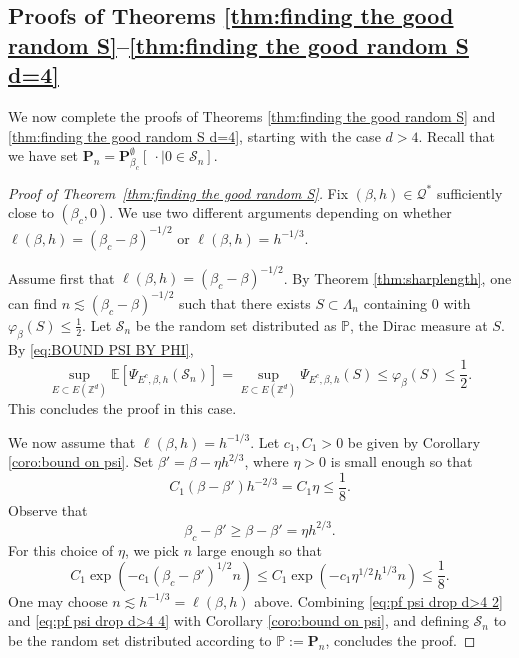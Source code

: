 \documentclass[11pt,a4paper]{article}
\numberwithin{equation}{section}
\theoremstyle{plain}
\theoremstyle{definition}
\begin{document}
\subsection{Proofs of Theorems \ref{thm:finding the good random S}--\ref{thm:finding the good random S d=4}}


We now complete the proofs of Theorems \ref{thm:finding the good random S} and \ref{thm:finding the good random S d=4}, starting with the case $d>4$. Recall that we have set $\mathbf P_n=\mathbf P_{\beta_c}^\emptyset[\: \cdot\mid 0\in \mathcal S_n]$.
\begin{proof}[Proof of Theorem~\textup{\ref{thm:finding the good random S}}] Fix $(\beta,h)\in \mathcal Q^*$ sufficiently close to $(\beta_c,0)$. We use two different arguments depending on whether $\ell(\beta,h)=(\beta_c-\beta)^{-1/2}$ or $\ell(\beta,h)=h^{-1/3}$. 

 Assume first that $\ell(\beta,h)=(\beta_c-\beta)^{-1/2}$. By Theorem \ref{thm:sharplength}, one can find $n\lesssim (\beta_c-\beta)^{-1/2}$ such that there exists $S\subset \Lambda_n$ containing $0$ with $\varphi_{\beta}(S)\leq \tfrac{1}{2}$. Let $\mathcal S_n$ be the random set distributed as $\mathbb P$, the Dirac measure at $S$. By \eqref{eq:BOUND PSI BY PHI},
\begin{equation}
	\sup_{E\subset E(\mathbb Z^d)}\mathbb E[\Psi_{E^c,\beta,h}(\mathcal S_n)]=\sup_{E\subset E(\mathbb Z^d)}\Psi_{E^c,\beta,h}(S)\leq \varphi_{\beta}(S)\leq \frac{1}{2}.
\end{equation}
This concludes the proof in this case.

We now assume that $\ell(\beta,h)=h^{-1/3}$. Let $c_1,C_1>0$ be given by Corollary \ref{coro:bound on psi}. Set $\beta'=\beta-\eta h^{2/3}$, where $\eta>0$ is small enough so that
\begin{equation}\label{eq:pf psi drop d>4 2}
	C_1(\beta-\beta')h^{-2/3}= C_1\eta\leq \frac{1}{8}.
\end{equation}
Observe that 
\begin{equation}\label{eq:pf psi drop d>4 3}
	\beta_c-\beta'\geq \beta-\beta'= \eta h^{2/3}.\end{equation}
For this choice of $\eta$,  we pick $n$ large enough so that
\begin{equation}\label{eq:pf psi drop d>4 4}
	C_1\exp(-c_1(\beta_c-\beta')^{1/2}n)\leq C_1\exp(-c_1\eta^{1/2}h^{1/3}n)\leq \frac{1}{8}.
\end{equation}
One may choose $n\lesssim h^{-1/3}=\ell(\beta,h)$ above. Combining \eqref{eq:pf psi drop d>4 2} and \eqref{eq:pf psi drop d>4 4} with Corollary \ref{coro:bound on psi}, and defining $\mathcal S_n$ to be the random set distributed according to $\mathbb P:=\mathbf P_n$, concludes the proof.
\end{proof}
\end{document}
